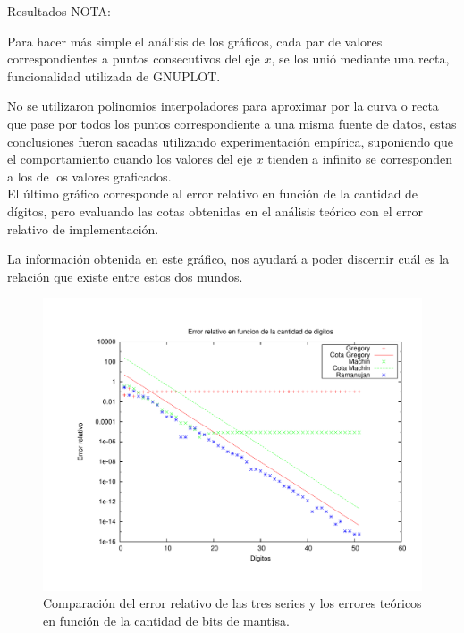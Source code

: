 \begin{section}{Resultados}
	NOTA: 
	
	Para hacer más simple el análisis de los gráficos, cada par de valores correspondientes a puntos consecutivos del eje $x$, se los unió mediante una recta, funcionalidad utilizada de GNUPLOT.
	
	No se utilizaron polinomios interpoladores para aproximar por la curva o recta que pase por todos los puntos correspondiente a una misma fuente de datos, estas conclusiones fueron sacadas utilizando experimentación empírica, suponiendo que el comportamiento cuando los valores del eje $x$ tienden a infinito se corresponden a los de los valores graficados.\\

	El último gráfico corresponde al error relativo en función de la cantidad de dígitos, pero evaluando las cotas obtenidas en el análisis teórico con el error relativo de implementación.
	
	La información obtenida en este gráfico, nos ayudará a poder discernir cuál es la relación que existe entre estos dos mundos.
	
	\begin{figure}[H]
	  \centering
		\includegraphics[width=14cm]{graficos/cotas.pdf}
	  \caption{Comparación del error relativo de las tres series y los errores teóricos en función de la cantidad de bits de mantisa.}
	  \label{fig:cotas}
	\end{figure}	

\end{section}
